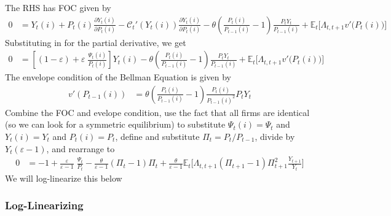 \documentclass[12pt]{article}
\theoremstyle{plain}
\theoremstyle{definition}
\theoremstyle{remark}
\newcommand{\calC}{\mathcal{C}}
\newcommand{\E}{\mathbb{E}}
\begin{document}
The RHS has FOC given by
\begin{align*}
  0 &=
  Y_t(i)
  + P_t(i)\frac{\partial Y_t(i)}{\partial P_t(i)}
  - \calC_t'(Y_t(i))\frac{\partial Y_t(i)}{\partial P_t(i)}
  -
  \theta
  \left(
  \frac{P_t(i)}{P_{t-1}(i)}-1
  \right) \frac{P_tY_t}{P_{t-1}(i)}
  + \E_t\big[
    \Lambda_{t,t+1}v'\big( P_t(i) \big)
  \big]
\end{align*}
Substituting in for the partial derivative, we get
\begin{align*}
  0
  &=
  \left[
  (1-\varepsilon)
  + \varepsilon \;\frac{\Psi_t(i)}{P_t(i)}
  \right]Y_t(i)
  -
  \theta
  \left(
  \frac{P_t(i)}{P_{t-1}(i)}-1
  \right) \frac{P_tY_t}{P_{t-1}(i)}
  + \E_t\big[
    \Lambda_{t,t+1}v'\big( P_t(i) \big)
  \big]
\end{align*}
The envelope condition of the Bellman Equation is given by
\begin{align*}
  v'(P_{t-1}(i))
  &= \theta\left(
    \frac{P_t(i)}{P_{t-1}(i)}-1
  \right)
  \frac{P_t(i)}{P_{t-1}(i)^2}
  P_tY_t
\end{align*}
Combine the FOC and evelope condition, use the fact that
all firms are identical (so we can look for a symmetric equilibrium)
to substitute $\Psi_t(i)=\Psi_t$ and $Y_t(i)=Y_t$ and $P_t(i)=P_t$,
define and substitute $\Pi_t=P_t/P_{t-1}$, divide by
$Y_t(\varepsilon-1)$, and rearrange to
\begin{align*}
  0
  &=
  -1 +
  \frac{\varepsilon}{\varepsilon-1}
  \;\frac{\Psi_t}{P_t}
  -
  \frac{\theta}{\varepsilon-1}
  \left(
  \Pi_t-1
  \right) \Pi_t
  + \frac{\theta}{\varepsilon-1} \E_t\big[
    \Lambda_{t,t+1}
    \left(
    \Pi_{t+1}-1
    \right)
    \Pi_{t+1}^2
    \frac{Y_{t+1}}{Y_t}
  \big]
\end{align*}
We will log-linearize this below

\subsubsection{Log-Linearizing}
\end{document}
